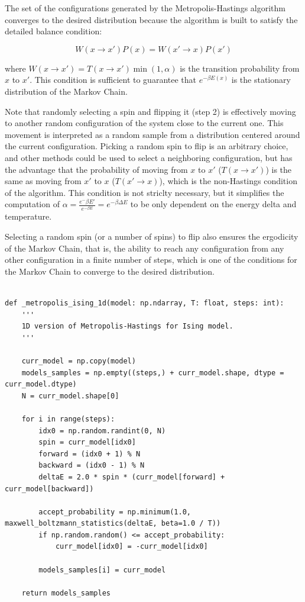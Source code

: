 The set of the configurations generated by the Metropolis-Hastings algorithm converges to the desired distribution because the algorithm is built to satisfy the detailed balance condition:

\begin{equation}
    W(x \to x') P(x) = W(x' \to x) P(x')
\end{equation}

where $W(x \to x') = T(x \to x') \min{\left(1, \alpha \right)}$ is the transition probability from $x$ to $x'$. This condition is sufficient to guarantee that $e^{-\beta E(x)}$ is the stationary distribution of the Markov Chain.

Note that randomly selecting a spin and flipping it (step 2) is effectively moving to another random configuration of the system close to the current one. This movement is interpreted as a random sample from a distribution centered around the current configuration. Picking a random spin to flip is an arbitrary choice, and other methods could be used to select a neighboring configuration, but has the advantage that the probability of moving from $x$ to $x'$ ($T(x \to x')$) is the same as moving from $x'$ to $x$ ($T(x' \to x)$), which is the non-Hastings condition of the algorithm. This condition is not striclty necessary, but it simplifies the computation of $\alpha = \frac{e^-\beta E'}{e^{-\beta E}} = e^{-\beta \Delta E}$ to be only dependent on the energy delta and temperature.

Selecting a random spin (or a number of spins) to flip also ensures the ergodicity of the Markov Chain, that is, the ability to reach any configuration from any other configuration in a finite number of steps, which is one of the conditions for the Markov Chain to converge to the desired distribution.

\begin{verbatim}

def _metropolis_ising_1d(model: np.ndarray, T: float, steps: int):
    '''
    1D version of Metropolis-Hastings for Ising model.
    '''

    curr_model = np.copy(model)
    models_samples = np.empty((steps,) + curr_model.shape, dtype = curr_model.dtype)
    N = curr_model.shape[0]
    
    for i in range(steps):
        idx0 = np.random.randint(0, N)
        spin = curr_model[idx0]
        forward = (idx0 + 1) % N
        backward = (idx0 - 1) % N
        deltaE = 2.0 * spin * (curr_model[forward] + curr_model[backward])
        
        accept_probability = np.minimum(1.0, maxwell_boltzmann_statistics(deltaE, beta=1.0 / T))
        if np.random.random() <= accept_probability:
            curr_model[idx0] = -curr_model[idx0]
        
        models_samples[i] = curr_model
    
    return models_samples

\end{verbatim}

